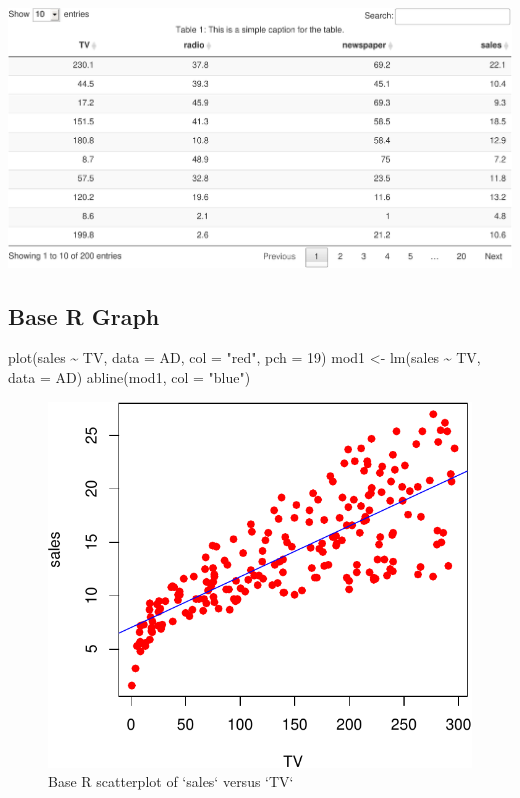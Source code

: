 \documentclass[
]{article}
\newenvironment{Shaded}{\begin{snugshade}}{\end{snugshade}}
\newcommand{\AttributeTok}[1]{\textcolor[rgb]{0.77,0.63,0.00}{#1}}
\newcommand{\DecValTok}[1]{\textcolor[rgb]{0.00,0.00,0.81}{#1}}
\newcommand{\FunctionTok}[1]{\textcolor[rgb]{0.00,0.00,0.00}{#1}}
\newcommand{\NormalTok}[1]{#1}
\newcommand{\OtherTok}[1]{\textcolor[rgb]{0.56,0.35,0.01}{#1}}
\newcommand{\SpecialCharTok}[1]{\textcolor[rgb]{0.00,0.00,0.00}{#1}}
\newcommand{\StringTok}[1]{\textcolor[rgb]{0.31,0.60,0.02}{#1}}
\begin{document}
\begin{center}\includegraphics{SDM-CHAP24_files/figure-latex/readin-1} \end{center}

\hypertarget{base-r-graph}{%
\subsection{Base R Graph}\label{base-r-graph}}

\begin{Shaded}
\begin{Highlighting}[]
\FunctionTok{plot}\NormalTok{(sales }\SpecialCharTok{\textasciitilde{}}\NormalTok{ TV, }\AttributeTok{data =}\NormalTok{ AD, }\AttributeTok{col =} \StringTok{"red"}\NormalTok{, }\AttributeTok{pch =} \DecValTok{19}\NormalTok{)}
\NormalTok{mod1 }\OtherTok{\textless{}{-}} \FunctionTok{lm}\NormalTok{(sales }\SpecialCharTok{\textasciitilde{}}\NormalTok{ TV, }\AttributeTok{data =}\NormalTok{ AD)}
\FunctionTok{abline}\NormalTok{(mod1, }\AttributeTok{col =} \StringTok{"blue"}\NormalTok{)}
\end{Highlighting}
\end{Shaded}

\begin{figure}

{\centering \includegraphics{SDM-CHAP24_files/figure-latex/base1-1} 

}

\caption{Base R scatterplot of `sales` versus `TV`}\label{fig:base1}
\end{figure}
\end{document}
